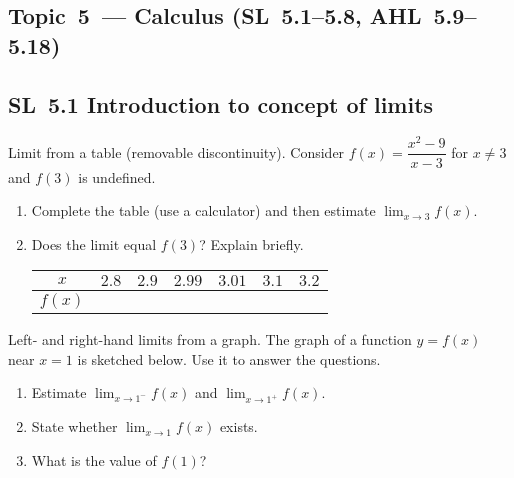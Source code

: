 \documentclass[11pt]{article}
\def\textbf#1{#1}%
\newcommand{\tocsubsection}[1]{\subsection{#1}}
\newcounter{question}
\begin{document}
\tocsubsection{Topic 5 — Calculus (SL 5.1–5.8, AHL 5.9–5.18)}



\tocsubsection{SL 5.1 \; Introduction to concept of limits}


\begin{question}
\textbf{Limit from a table (removable discontinuity).}
Consider $f(x)=\dfrac{x^{2}-9}{x-3}$ for $x\ne 3$ and $f(3)$ is undefined.
\begin{enumerate}
  \item Complete the table (use a calculator) and then estimate $\displaystyle\lim_{x\to 3} f(x)$.
  \item Does the limit equal $f(3)$? Explain briefly.

\begin{center}
\begin{tabular}{c|cccccc}
$x$ & $2.8$ & $2.9$ & $2.99$ & $3.01$ & $3.1$ & $3.2$\\\hline
$f(x)$ & & & & & &
\end{tabular}
\end{center}
\end{enumerate}
\end{question}

\begin{question}
\textbf{Left- and right-hand limits from a graph.}
The graph of a function $y=f(x)$ near $x=1$ is sketched below. Use it to answer the questions.
\begin{enumerate}
  \item Estimate $\displaystyle\lim_{x\to 1^-} f(x)$ and $\displaystyle\lim_{x\to 1^+} f(x)$.
  \item State whether $\displaystyle\lim_{x\to 1} f(x)$ exists.
  \item What is the value of $f(1)$?
\end{enumerate}

\begin{center}
\end{center}
\end{question}
\end{document}

